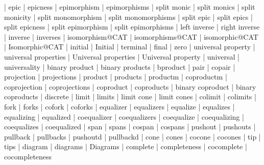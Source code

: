     |   epic
    |   epicness
    |   epimorphism
    |   epimorphisms
    |   split monic
    |   split monics
    |   split monicity
    |   split monomorphism
    |   split monomorphisms
    |   split epic
    |   split epics
    |   split epicness
    |   split epimorphism
    |   split epimorphisms
    |   left inverse
    |   right inverse
    |   inverse
    |   inverses
    |   isomorphism@CAT
    |   isomorphisms@CAT
    |   isomorphic@CAT
    |   Isomorphic@CAT
    |   initial
    |   Initial
    |   terminal
    |   final
    |   zero
    |   universal property
    |   universal properties
    |   Universal properties
    |   Universal property
    |   universal
    |   universality
    |   binary product
    |   binary products
    |   bproduct
    |   pair
    |   copair
    |   projection
    |   projections
    |   product
    |   products
    |   productm
    |   coproductm
    |   coprojection
    |   coprojections
    |   coproduct
    |   coproducts
    |   binary coproduct
    |   binary coproducts
    |   discrete
    |   limit
    |   limits
    |   limit cone
    |   limit cones
    |   colimit
    |   colimits
    |   fork
    |   forks
    |   cofork
    |   coforks
    |   equalizer
    |   equalizers
    |   equalize
    |   equalizes
    |   equalizing
    |   equalized
    |   coequalizer
    |   coequalizers
    |   coequalize
    |   coequalizing
    |   coequalizes
    |   coequalized
    |   span
    |   spans
    |   cospan
    |   cospans
    |   pushout
    |   pushouts
    |   pullback
    |   pullbacks
    |   pushoutd
    |   pullbackd
    |   cone
    |   cones
    |   cocone
    |   cocones
    |   tip
    |   tips
    |   diagram
    |   diagrams
    |   Diagrams
    |   complete
    |   completeness
    |   cocomplete
    |   cocompleteness
